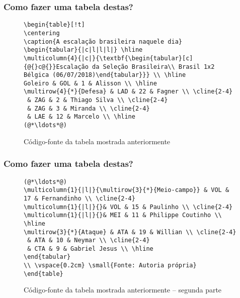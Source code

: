 \begin{frame}[fragile] \frametitle{Como fazer uma tabela destas?}

\begin{figure}[!t]
\caption{Código-fonte da tabela mostrada anteriormente}
\begin{lstlisting}
\begin{table}[!t]
\centering
\caption{A escalação brasileira naquele dia}
\begin{tabular}{|c|l|l|l|} \hline
\multicolumn{4}{|c|}{\textbf{\begin{tabular}[c]{@{}c@{}}Escalação da Seleção Brasileira\\ Brasil 1x2 Bélgica (06/07/2018)\end{tabular}}} \\ \hline
Goleiro & GOL & 1 & Alisson \\ \hline
\multirow{4}{*}{Defesa} & LAD & 22 & Fagner \\ \cline{2-4} 
 & ZAG & 2 & Thiago Silva \\ \cline{2-4} 
 & ZAG & 3 & Miranda \\ \cline{2-4} 
 & LAE & 12 & Marcelo \\ \hline
(@*\ldots*@)
\end{lstlisting}
\ownsrc
\end{figure}
\end{frame}

\begin{frame}[fragile] \frametitle{Como fazer uma tabela destas?}
\begin{figure}[!t]
\caption{Código-fonte da tabela mostrada anteriormente -- segunda parte}
\begin{lstlisting}
(@*\ldots*@)
\multicolumn{1}{|l|}{\multirow{3}{*}{Meio-campo}} & VOL & 17 & Fernandinho \\ \cline{2-4} 
\multicolumn{1}{|l|}{}& VOL & 15 & Paulinho \\ \cline{2-4} 
\multicolumn{1}{|l|}{}& MEI & 11 & Philippe Coutinho \\ \hline
\multirow{3}{*}{Ataque} & ATA & 19 & Willian \\ \cline{2-4} 
 & ATA & 10 & Neymar \\ \cline{2-4} 
 & CTA & 9 & Gabriel Jesus \\ \hline
\end{tabular}
\\ \vspace{0.2cm} \small{Fonte: Autoria própria}
\end{table}
\end{lstlisting}
\ownsrc
\end{figure}
\end{frame}

